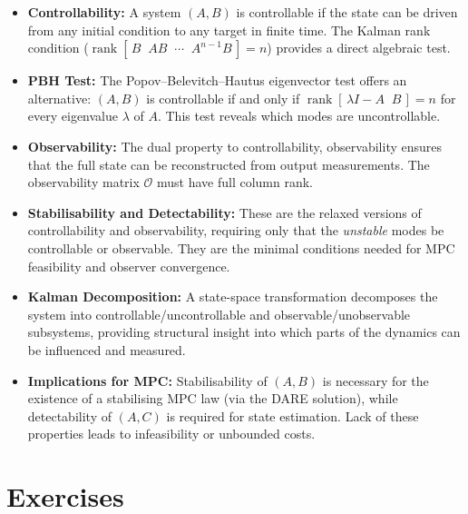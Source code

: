 \begin{itemize}
	\item \textbf{Controllability:} A system $(A, B)$ is controllable if the state can be driven from any initial condition to any target in finite time. The Kalman rank condition ($\operatorname{rank}[\,B\;\; AB\;\; \cdots\;\; A^{n-1}B\,] = n$) provides a direct algebraic test.

	\item \textbf{PBH Test:} The Popov--Belevitch--Hautus eigenvector test offers an alternative: $(A, B)$ is controllable if and only if $\operatorname{rank}[\,\lambda I - A\;\; B\,] = n$ for every eigenvalue $\lambda$ of $A$. This test reveals which modes are uncontrollable.

	\item \textbf{Observability:} The dual property to controllability, observability ensures that the full state can be reconstructed from output measurements. The observability matrix $\mathcal{O}$ must have full column rank.

	\item \textbf{Stabilisability and Detectability:} These are the relaxed versions of controllability and observability, requiring only that the \emph{unstable} modes be controllable or observable. They are the minimal conditions needed for MPC feasibility and observer convergence.

	\item \textbf{Kalman Decomposition:} A state-space transformation decomposes the system into controllable/uncontrollable and observable/unobservable subsystems, providing structural insight into which parts of the dynamics can be influenced and measured.

	\item \textbf{Implications for MPC:} Stabilisability of $(A, B)$ is necessary for the existence of a stabilising MPC law (via the DARE solution), while detectability of $(A, C)$ is required for state estimation. Lack of these properties leads to infeasibility or unbounded costs.
\end{itemize}

\section*{Exercises}

